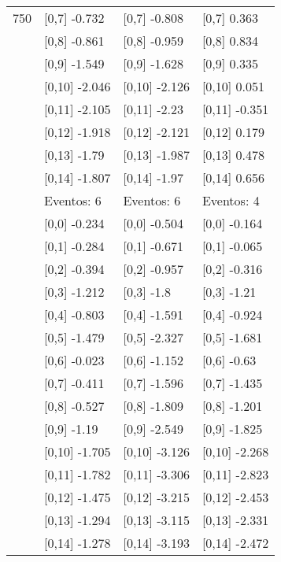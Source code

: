 \begin{table}
\begin{tabular}[t]{llll}
750 & {}[0,7] -0.732 & {}[0,7] -0.808 & {}[0,7] 0.363\\
\addlinespace
 & {}[0,8] -0.861 & {}[0,8] -0.959 & {}[0,8] 0.834\\
 & {}[0,9] -1.549 & {}[0,9] -1.628 & {}[0,9] 0.335\\
 & {}[0,10] -2.046 & {}[0,10] -2.126 & {}[0,10] 0.051\\
 & {}[0,11] -2.105 & {}[0,11] -2.23 & {}[0,11] -0.351\\
 & {}[0,12] -1.918 & {}[0,12] -2.121 & {}[0,12] 0.179\\
\addlinespace
 & {}[0,13] -1.79 & {}[0,13] -1.987 & {}[0,13] 0.478\\
 & {}[0,14] -1.807 & {}[0,14] -1.97 & {}[0,14] 0.656\\
 & Eventos:  6 & Eventos:  6 & Eventos:  4\\
 & {}[0,0] -0.234 & {}[0,0] -0.504 & {}[0,0] -0.164\\
 & {}[0,1] -0.284 & {}[0,1] -0.671 & {}[0,1] -0.065\\
\addlinespace
 & {}[0,2] -0.394 & {}[0,2] -0.957 & {}[0,2] -0.316\\
 & {}[0,3] -1.212 & {}[0,3] -1.8 & {}[0,3] -1.21\\
 & {}[0,4] -0.803 & {}[0,4] -1.591 & {}[0,4] -0.924\\
 & {}[0,5] -1.479 & {}[0,5] -2.327 & {}[0,5] -1.681\\
 & {}[0,6] -0.023 & {}[0,6] -1.152 & {}[0,6] -0.63\\
\addlinespace
1000 & {}[0,7] -0.411 & {}[0,7] -1.596 & {}[0,7] -1.435\\
 & {}[0,8] -0.527 & {}[0,8] -1.809 & {}[0,8] -1.201\\
 & {}[0,9] -1.19 & {}[0,9] -2.549 & {}[0,9] -1.825\\
 & {}[0,10] -1.705 & {}[0,10] -3.126 & {}[0,10] -2.268\\
 & {}[0,11] -1.782 & {}[0,11] -3.306 & {}[0,11] -2.823\\
\addlinespace
 & {}[0,12] -1.475 & {}[0,12] -3.215 & {}[0,12] -2.453\\
 & {}[0,13] -1.294 & {}[0,13] -3.115 & {}[0,13] -2.331\\
 & {}[0,14] -1.278 & {}[0,14] -3.193 & {}[0,14] -2.472\\
\bottomrule
\end{tabular}
\end{table}
